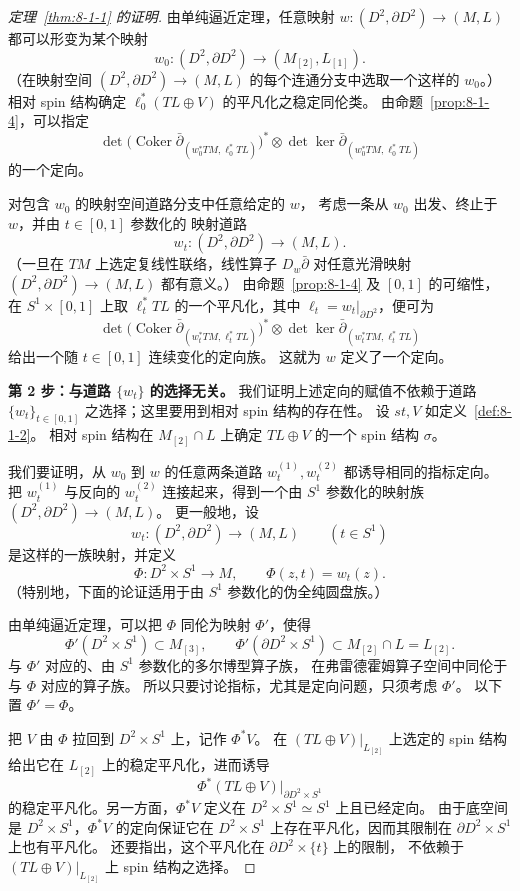 \begin{proof}[定理~\ref{thm:8-1-1} 的证明]
由单纯逼近定理，任意映射
$w\colon(D^2,\partial D^2)\to(M,L)$ 都可以形变为某个映射
\[
w_0\colon(D^2,\partial D^2)\longrightarrow(M_{[2]},L_{[1]}).
\]
（在映射空间
$(D^2,\partial D^2)\to(M,L)$ 的每个连通分支中选取一个这样的
$w_0$。）相对 spin 结构确定
$\ell_0^*(TL\oplus V)$ 的平凡化之稳定同伦类。
由命题~\ref{prop:8-1-4}，可以指定
\[
\det\bigl(\operatorname{Coker}
 \bar\partial_{(w_0^*TM,\ell_0^*TL)}\bigr)^*
\otimes
\det\ker\bar\partial_{(w_0^*TM,\ell_0^*TL)}
\]
的一个定向。

对包含 $w_0$ 的映射空间道路分支中任意给定的 $w$，
考虑一条从 $w_0$ 出发、终止于 $w$，并由 $t\in[0,1]$ 参数化的
映射道路
\[
w_t\colon(D^2,\partial D^2)\longrightarrow(M,L).
\]
（一旦在 $TM$ 上选定复线性联络，线性算子
$D_w\bar\partial$ 对任意光滑映射
$(D^2,\partial D^2)\to(M,L)$ 都有意义。）
由命题~\ref{prop:8-1-4} 及 $[0,1]$ 的可缩性，
在 $S^1\times[0,1]$ 上取 $\ell_t^*TL$ 的一个平凡化，其中
$\ell_t=w_t|_{\partial D^2}$，便可为
\[
\det\bigl(\operatorname{Coker}
 \bar\partial_{(w_t^*TM,\ell_t^*TL)}\bigr)^*
\otimes
\det\ker\bar\partial_{(w_t^*TM,\ell_t^*TL)}
\]
给出一个随 $t\in[0,1]$ 连续变化的定向族。
这就为 $w$ 定义了一个定向。

\medskip
\noindent\textbf{第 2 步：与道路 $\{w_t\}$ 的选择无关。}
我们证明上述定向的赋值不依赖于道路
$\{w_t\}_{t\in[0,1]}$ 之选择；这里要用到相对 spin 结构的存在性。
设 $st,V$ 如定义~\ref{def:8-1-2}。
相对 spin 结构在 $M_{[2]}\cap L$ 上确定
$TL\oplus V$ 的一个 spin 结构 $\sigma$。

我们要证明，从 $w_0$ 到 $w$ 的任意两条道路
$w_t^{(1)},w_t^{(2)}$ 都诱导相同的指标定向。
把 $w_t^{(1)}$ 与反向的 $w_t^{(2)}$ 连接起来，得到一个由 $S^1$
参数化的映射族 $(D^2,\partial D^2)\to(M,L)$。
更一般地，设
\[
w_t\colon(D^2,\partial D^2)\longrightarrow(M,L)
\qquad(t\in S^1)
\]
是这样的一族映射，并定义
\[
\Phi\colon D^2\times S^1\longrightarrow M,
\qquad
\Phi(z,t)=w_t(z).
\]
（特别地，下面的论证适用于由 $S^1$ 参数化的伪全纯圆盘族。）

由单纯逼近定理，可以把 $\Phi$ 同伦为映射 $\Phi'$，使得
\[
\Phi'(D^2\times S^1)\subset M_{[3]},
\qquad
\Phi'(\partial D^2\times S^1)
\subset M_{[2]}\cap L=L_{[2]}.
\]
与 $\Phi'$ 对应的、由 $S^1$ 参数化的多尔博型算子族，
在弗雷德霍姆算子空间中同伦于与 $\Phi$ 对应的算子族。
所以只要讨论指标，尤其是定向问题，只须考虑 $\Phi'$。
以下置 $\Phi'=\Phi$。

把 $V$ 由 $\Phi$ 拉回到 $D^2\times S^1$ 上，记作 $\Phi^*V$。
在 $(TL\oplus V)|_{L_{[2]}}$ 上选定的 spin 结构给出它在
$L_{[2]}$ 上的稳定平凡化，进而诱导
\[
\Phi^*(TL\oplus V)|_{\partial D^2\times S^1}
\]
的稳定平凡化。另一方面，$\Phi^*V$ 定义在
$D^2\times S^1\simeq S^1$ 上且已经定向。
由于底空间是 $D^2\times S^1$，$\Phi^*V$ 的定向保证它在
$D^2\times S^1$ 上存在平凡化，因而其限制在
$\partial D^2\times S^1$ 上也有平凡化。
还要指出，这个平凡化在 $\partial D^2\times\{t\}$ 上的限制，
不依赖于 $(TL\oplus V)|_{L_{[2]}}$ 上 spin 结构之选择。%


\end{proof}
